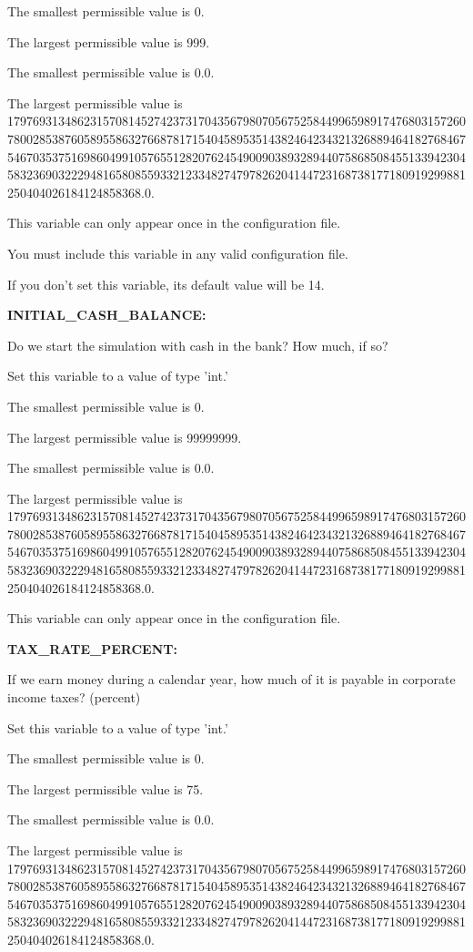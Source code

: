 The smallest permissible value is 0.

The largest permissible value is 999.

The smallest permissible value is 0.0.

The largest permissible value is 179769313486231570814527423731704356798070567525844996598917476803157260780028538760589558632766878171540458953514382464234321326889464182768467546703537516986049910576551282076245490090389328944075868508455133942304583236903222948165808559332123348274797826204144723168738177180919299881250404026184124858368.0.

This variable can only appear once in the configuration file.

You must include  this variable in any valid configuration file.

If you don't set this variable, its default value will be 14.


\textbf{INITIAL\_CASH\_BALANCE:}


Do we start the simulation with cash in the bank?  How much, if so?

Set this variable to a value of type 'int.'

The smallest permissible value is 0.

The largest permissible value is 99999999.

The smallest permissible value is 0.0.

The largest permissible value is 179769313486231570814527423731704356798070567525844996598917476803157260780028538760589558632766878171540458953514382464234321326889464182768467546703537516986049910576551282076245490090389328944075868508455133942304583236903222948165808559332123348274797826204144723168738177180919299881250404026184124858368.0.

This variable can only appear once in the configuration file.


\textbf{TAX\_RATE\_PERCENT:}


If we earn money during a calendar year, how much of it is payable in corporate income taxes? (percent)

Set this variable to a value of type 'int.'

The smallest permissible value is 0.

The largest permissible value is 75.

The smallest permissible value is 0.0.

The largest permissible value is 179769313486231570814527423731704356798070567525844996598917476803157260780028538760589558632766878171540458953514382464234321326889464182768467546703537516986049910576551282076245490090389328944075868508455133942304583236903222948165808559332123348274797826204144723168738177180919299881250404026184124858368.0.


